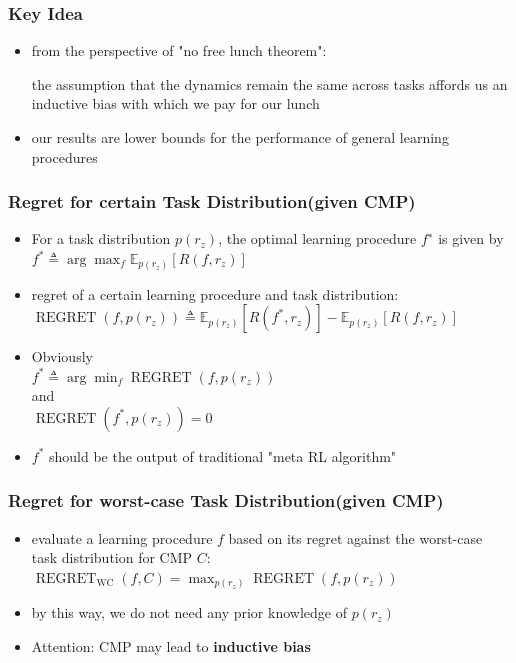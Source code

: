 \documentclass[aspectratio=169]{beamer}
\begin{document}
\begin{frame}
  \frametitle{Key Idea}
  \begin{itemize}
    \item from the perspective of "no free lunch theorem": 
    
    the assumption that the dynamics remain the same across tasks affords us an inductive bias with which we pay for our lunch
    \item our results are lower bounds for the performance of general learning procedures
  \end{itemize}
\end{frame}

\begin{frame}
  \frametitle{Regret for certain Task Distribution(given CMP)}
  \begin{itemize}
    \item For a task distribution $p(r_z)$, the optimal learning procedure $f^∗$ is given by\\
    $f^{*} \triangleq \arg \max _{f} \mathbb{E}_{p\left(r_{z}\right)}\left[R\left(f, r_{z}\right)\right]$
    \item regret of a certain learning procedure and task distribution:\\
    $\operatorname{REGRET}\left(f, p\left(r_{z}\right)\right) \triangleq \mathbb{E}_{p\left(r_{z}\right)}\left[R\left(f^{*}, r_{z}\right)\right]-\mathbb{E}_{p\left(r_{z}\right)}\left[R\left(f, r_{z}\right)\right]$
    \item Obviously\\$f^{*} \triangleq \arg \min _{f} \operatorname{REGRET}\left(f, p\left(r_{z}\right)\right) $\\
    and\\$\operatorname{REGRET}\left(f^*, p\left(r_{z}\right)\right)  = 0$
    \item $f^*$ should be the output of traditional "meta RL algorithm"
  \end{itemize}
\end{frame}

\begin{frame}
  \frametitle{Regret for worst-case Task Distribution(given CMP)}
  \begin{itemize}
    \item evaluate a learning procedure $f$ based on its regret against the worst-case task distribution for CMP $C$:\\
    $\operatorname{REGRET}_{\mathrm{WC}}(f, C)=\max _{p\left(r_{z}\right)} \operatorname{REGRET}\left(f, p\left(r_{z}\right)\right)$
    \item by this way, we do not need any prior knowledge of $p(r_z)$
    \item Attention: CMP may lead to \textbf{inductive bias}
  \end{itemize}
\end{frame}
\end{document}
